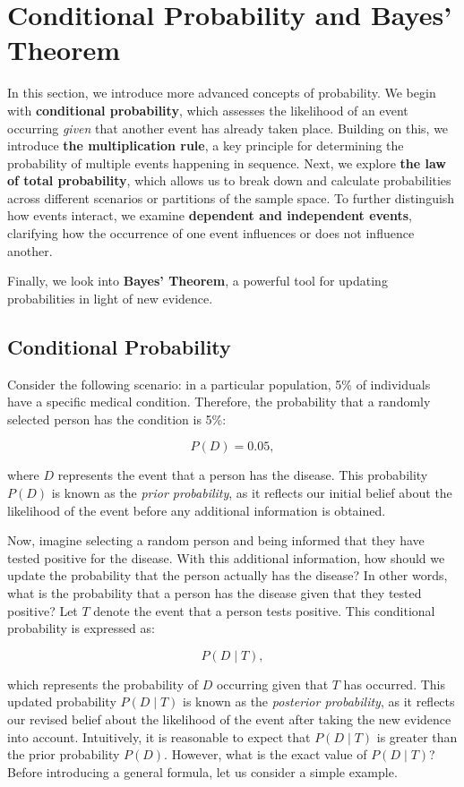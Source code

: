 \chapter{Conditional Probability and Bayes' Theorem}
\label{chap:ch5}

In this section, we introduce more advanced concepts of probability. We begin with \textbf{conditional probability}, which assesses the likelihood of an event occurring \textit{given} that another event has already taken place. Building on this, we introduce \textbf{the multiplication rule}, a key principle for determining the probability of multiple events happening in sequence. Next, we explore \textbf{the law of total probability}, which allows us to break down and calculate probabilities across different scenarios or partitions of the sample space. To further distinguish how events interact, we examine \textbf{dependent and independent events}, clarifying how the occurrence of one event influences or does not influence another. 

Finally, we look into \textbf{Bayes' Theorem}, a powerful tool for updating probabilities in light of new evidence.

\section{Conditional Probability}
Consider the following scenario: in a particular population, 5\% of individuals have a specific medical condition. Therefore, the probability that a randomly selected person has the condition is 5\%:

\[
P(D) = 0.05,
\]

where \( D \) represents the event that a person has the disease. This probability \( P(D) \) is known as the \textit{prior probability}, as it reflects our initial belief about the likelihood of the event before any additional information is obtained.

Now, imagine selecting a random person and being informed that they have tested positive for the disease. With this additional information, how should we update the probability that the person actually has the disease? In other words, what is the probability that a person has the disease given that they tested positive? Let \( T \) denote the event that a person tests positive. This conditional probability is expressed as:

\[
P(D \mid T),
\]

which represents the probability of \( D \) occurring given that \( T \) has occurred. This updated probability \( P(D \mid T) \) is known as the \textit{posterior probability}, as it reflects our revised belief about the likelihood of the event after taking the new evidence into account. Intuitively, it is reasonable to expect that \( P(D \mid T) \) is greater than the prior probability \( P(D) \). However, what is the exact value of \( P(D \mid T) \)? Before introducing a general formula, let us consider a simple example.

